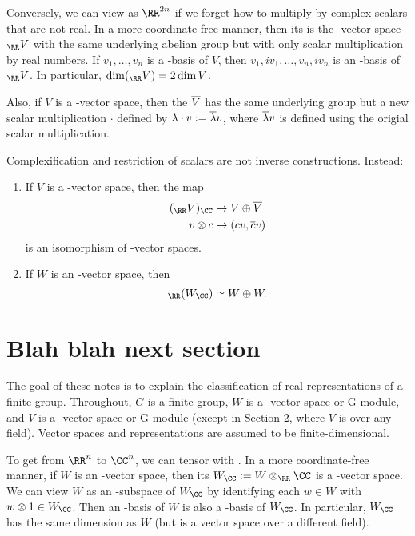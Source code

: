 \documentclass{scrartcl}
\begin{document}
Conversely, we can view \CC[n] as $\RR^{2n}$ if we forget how to multiply by complex scalars that are not real. In a more coordinate-free manner, then its  is the \RR-vector space $_{\RR} V$ with the same underlying abelian group but with only scalar multiplication by real numbers. If $v_1,\dots,v_n$ is a \CC-basis of $V$, then $v_1, iv_1,\dots,v_n,iv_n$ is an \RR-basis of $_{\RR} V$. In particular, $\dim(_{\RR} V) = 2\dim V$.

Also, if $V$ is a \CC-vector space, then the  $\overline{V}$ has the same underlying group but a new scalar multiplication $\cdot$ defined by $\lambda\cdot v := \overline{\lambda}v$, where $\overline{\lambda}v$ is defined using the origial scalar multiplication.

Complexification and restriction of scalars are not inverse constructions. Instead:
\begin{proposition}
    \hfill
    \begin{enumerate}[font=\normalfont]
        \item If $V$ is a \CC-vector space, then the map \begin{align*}
            (_{\RR} V)_{\CC} &\rightarrow V \oplus \ol{V} \\
            v\otimes c &\mapsto (cv,\ol{c}v) \\
        \end{align*} is an isomorphism of \CC-vector spaces.
        \item If $W$ is an \RR-vector space, then \[_{\RR}(W_{\CC}) \simeq W\oplus W.\]
    \end{enumerate}
\end{proposition}

\section{Blah blah next section}


The goal of these notes is to explain the classification of real representations of a finite
group. Throughout, $G$ is a finite group, $W$ is a \RR-vector space or \RR G-module, and $V$ is a
\CC-vector space or \CC G-module (except in Section 2, where $V$ is over any field). Vector spaces
and representations are assumed to be finite-dimensional.

To get from $\RR^n$ to $\CC^n$, we can tensor with \CC. In a more coordinate-free
manner, if $W$ is an \RR-vector space, then its  $W_{\CC} := W \otimes_{\RR} \CC$ is a \CC-vector
space. We can view $W$ as an \RR-subspace of $W_{\CC}$ by identifying each $w \in W$ with $w \otimes 1 \in W_{\CC}$.
Then an \RR-basis of $W$ is also a \CC-basis of $W_{\CC}$. In particular, $W_{\CC}$ has the same dimension as
$W$ (but is a vector space over a different field).
\end{document}

